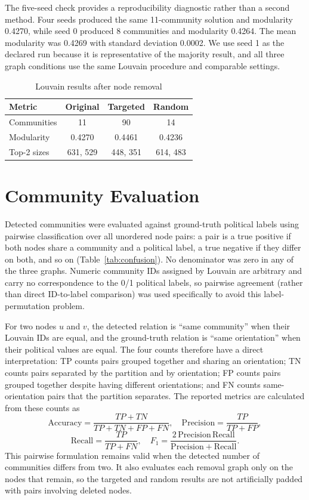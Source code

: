 \documentclass[conference]{IEEEtran}
\begin{document}
The five-seed check provides a reproducibility diagnostic rather than a second method. Four seeds produced the same 11-community solution and modularity 0.4270, while seed 0 produced 8 communities and modularity 0.4264. The mean modularity was 0.4269 with standard deviation 0.0002. We use seed 1 as the declared run because it is representative of the majority result, and all three graph conditions use the same Louvain procedure and comparable settings.

\begin{table}[htbp]
\caption{Louvain results after node removal}
\label{tab:louvain-removal}
\centering
\begin{tabular}{@{}lccc@{}}
\toprule
Metric & Original & Targeted & Random \\
\midrule
Communities & 11 & 90 & 14 \\
Modularity & 0.4270 & 0.4461 & 0.4236 \\
Top-2 sizes & 631, 529 & 448, 351 & 614, 483 \\
\bottomrule
\end{tabular}
\end{table}

\section{Community Evaluation}
Detected communities were evaluated against ground-truth political labels using pairwise classification over all unordered node pairs: a pair is a true positive if both nodes share a community and a political label, a true negative if they differ on both, and so on (Table~\ref{tab:confusion}). No denominator was zero in any of the three graphs. Numeric community IDs assigned by Louvain are arbitrary and carry no correspondence to the 0/1 political labels, so pairwise agreement (rather than direct ID-to-label comparison) was used specifically to avoid this label-permutation problem.

For two nodes $u$ and $v$, the detected relation is ``same community'' when their Louvain IDs are equal, and the ground-truth relation is ``same orientation'' when their political values are equal. The four counts therefore have a direct interpretation: TP counts pairs grouped together and sharing an orientation; TN counts pairs separated by the partition and by orientation; FP counts pairs grouped together despite having different orientations; and FN counts same-orientation pairs that the partition separates. The reported metrics are calculated from these counts as
\[
\mathrm{Accuracy}=\frac{TP+TN}{TP+TN+FP+FN},\quad
\mathrm{Precision}=\frac{TP}{TP+FP},
\]
\[
\mathrm{Recall}=\frac{TP}{TP+FN},\quad
F_1=\frac{2\,\mathrm{Precision}\,\mathrm{Recall}}
{\mathrm{Precision}+\mathrm{Recall}}.
\]
This pairwise formulation remains valid when the detected number of communities differs from two. It also evaluates each removal graph only on the nodes that remain, so the targeted and random results are not artificially padded with pairs involving deleted nodes.
\end{document}
